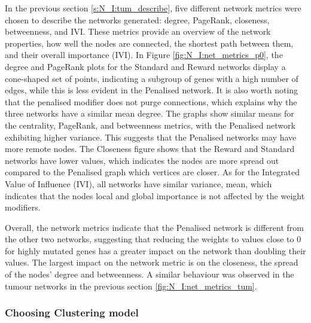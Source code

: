 In the previous section \ref{s:N_I:tum_describe}, five different network metrics were chosen to describe the networks generated: degree, PageRank, closeness, betweenness, and IVI. These metrics provide an overview of the network properties, how well the nodes are connected, the shortest path between them, and their overall importance (IVI). In Figure \ref{fig:N_I:net_metrics_p0}, the degree and PageRank plots for the Standard and Reward networks display a cone-shaped set of points, indicating a subgroup of genes with a high number of edges, while this is less evident in the Penalised network. It is also worth noting that the penalised modifier does not purge connections, which explains why the three networks have a similar mean degree. The graphs show similar means for the centrality, PageRank, and betweenness metrics, with the Penalised network exhibiting higher variance. This suggests that the Penalised networks may have more remote nodes. The Closeness figure shows that the Reward and Standard networks have lower values, which indicates the nodes are more spread out compared to the Penalised graph which vertices are closer. As for the Integrated Value of Influence (IVI), all networks have similar variance, mean, which indicates that the nodes local and global importance is not affected by the weight modifiers.

Overall, the network metrics indicate that the Penalised network is different from the other two networks, suggesting that reducing the weights to values close to 0 for highly mutated genes has a greater impact on the network than doubling their values. The largest impact on the network metric is on the closeness, the spread of the nodes' degree and betweenness. A similar behaviour was observed in the tumour networks in the previous section \cref{fig:N_I:net_metrics_tum}.


\subsubsection{Choosing Clustering model} \label{s:p0:clustering_analysis}

